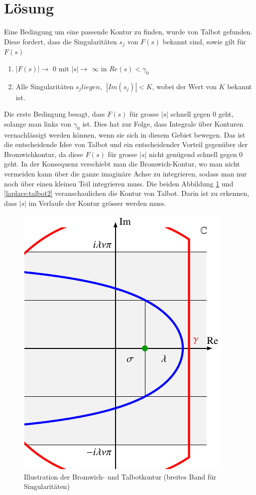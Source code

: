 %
%
%


\section{Lösung}
\label{laplace:section:Methode nach Talbot}
Eine Bedingung um eine passende Kontur zu finden, wurde von Talbot gefunden.
Diese fordert, dass die Singularitäten $s_{j}$ von $F(s)$ bekannt sind, sowie gilt für $F(s)$
\begin{enumerate}
\item
$|F(s)|\rightarrow$ $0$ mit $|s|\rightarrow$ $\infty$ in $Re(s)<\gamma_{0}$
\item
Alle Singularitäten $s_{j} liegen,~~|Im(s_{j})|<K$, wobei der Wert von $K$ bekannt ist.
\end{enumerate}

Die erste Bedingung besagt, dass $F(s)$ für grosse $|s|$ schnell gegen $0$ geht, solange man links von $\gamma_{0}$ ist. Dies hat zur Folge, dass Integrale über Konturen vernachlässigt werden können, wenn sie sich in diesem Gebiet bewegen. Das ist die entscheidende Idee von Talbot und ein entscheidender Vorteil gegenüber der Bromwichkontur, da diese $F(s)$ für grosse $|s|$ nicht genügend schnell gegen $0$ geht. In der Konsequenz verschiebt man die Bromwich-Kontur, wo man nicht vermeiden kann über die ganze imaginäre Achse zu integrieren, sodass man nur noch über einen kleinen Teil integrieren muss. Die beiden Abbildung \ref{laplace:talbot1} und \ref{laplace:talbot2} veranschaulichen die Kontur von Talbot. Darin ist zu erkennen, dass  $|s|$ im Verlaufe der Kontur grösser werden muss. 

\begin{figure}
\centering
\includegraphics{papers/laplace/images/talbot1.pdf}
\caption{Illustration der Bromwich- und Talbotkontur (breites Band für Singularitäten)
\label{laplace:talbot1}}
\end{figure}

